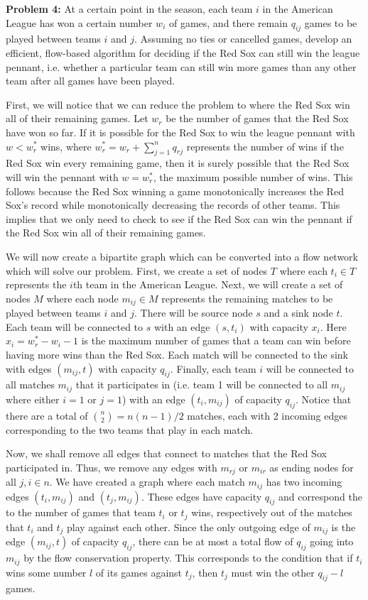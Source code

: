 \documentclass[psamsfonts]{amsart}
\newenvironment{sol}{\vspace{0.25cm}{\large \bfseries Solution:}}{\qedsymbol}
\newenvironment{prob}[1]{\begin{framed}{\large \bfseries Problem #1:}}{\end{framed}}
\begin{document}
\begin{prob}{4}
At a certain point in the season, each team $i$ in the American League has won a certain number $w_i$ of games, and there remain $q_{ij}$ games to be played between teams $i$ and $j$. Assuming no ties or cancelled games, develop an efficient, flow-based algorithm for deciding if the Red Sox can still win the league pennant, i.e. whether a particular team can still win more games than any other team after all games have been played.
\end{prob}
\begin{sol}
First, we will notice that we can reduce the problem to where the Red Sox win all of their remaining games. Let $w_r$ be the number of games that the Red Sox have won so far. If it is possible for the Red Sox to win the league pennant with $w < w_{r}^*$ wins, where $w_{r}^* = w_{r} + \sum_{j=1}^n q_{rj}$ represents the number of wins if the Red Sox win every remaining game, then it is surely possible that the Red Sox will win the pennant with $w = w_r^*$, the maximum possible number of wins. This follows because the Red Sox winning a game monotonically increases the Red Sox's record while monotonically decreasing the records of other teams. This implies that we only need to check to see if the Red Sox can win the pennant if the Red Sox win all of their remaining games.

We will now create a bipartite graph which can be converted into a flow network which will solve our problem. First, we create a set of nodes $T$ where each $t_i \in T$ represents the $i$th team in the American League. Next, we will create a set of nodes $M$ where each node $m_{ij} \in M$ represents the remaining matches to be played between teams $i$ and $j$. There will be source node $s$ and a sink node $t$. Each team will be connected to $s$ with an edge $(s, t_i)$ with capacity $x_i$. Here $x_i = w_{r}^* - w_i - 1$ is the maximum number of games that a team can win before having more wins than the Red Sox. Each match will be connected to the sink with edges $(m_{ij}, t)$ with capacity $q_{ij}$. Finally, each team $i$ will be connected to all matches $m_{ij}$ that it participates in (i.e. team 1 will be connected to all $m_{ij}$ where either $i=1$ or $j=1$) with an edge $(t_{i}, m_{ij})$ of capacity $q_{ij}$. Notice that there are a total of ${ n \choose 2} = n(n-1)/2$ matches, each with 2 incoming edges corresponding to the two teams that play in each match.

Now, we shall remove all edges that connect to matches that the Red Sox participated in. Thus, we remove any edges with $m_{rj}$ or $m_{ir}$ as ending nodes for all $j, i \in n$. We have created a graph where each match $m_{ij}$ has two incoming edges $(t_i, m_{ij})$ and $(t_j, m_{ij})$. These edges have capacity $q_{ij}$ and correspond the to the number of games that team $t_i$ or $t_j$ wins, respectively out of the matches that $t_i$ and $t_j$ play against each other. Since the only outgoing edge of $m_{ij}$ is the edge $(m_{ij}, t)$ of capacity $q_{ij}$, there can be at most a total flow of $q_{ij}$ going into $m_{ij}$ by the flow conservation property. This corresponds to the condition that if $t_i$ wins some number $l$ of its games against $t_j$, then $t_j$ must win the other $q_{ij} - l$ games.


\end{sol}
\end{document}
